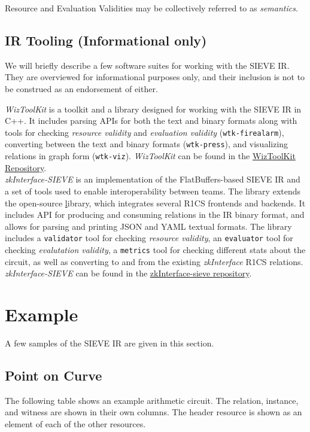 \documentclass[12pt]{article}
\begin{document}
Resource and Evaluation Validities may be collectively referred to as \textit{semantics}.

\subsection{IR Tooling (Informational only)}
We will briefly describe a few software suites for working with the SIEVE IR.
They are overviewed for informational purposes only, and their inclusion is not to be construed as an endorsement of either.

\textit{WizToolKit} is a toolkit and a library designed for working with the SIEVE IR in C++.
It includes parsing APIs for both the text and binary formats along with tools for checking \textit{resource validity} and \textit{evaluation validity} (\texttt{wtk-firealarm}), converting between the text and binary formats (\texttt{wtk-press}), and visualizing relations in graph form (\texttt{wtk-viz}).
\textit{WizToolKit} can be found in the \href{https://github.mit.edu/sieve-all/wiztoolkit}{WizToolKit Repository}.\\

\textit{zkInterface-SIEVE} is an implementation of the FlatBuffers-based SIEVE IR and a set of tools used to enable interoperability between teams. The library extends the open-source \href{https://github.com/QED-it/zkinterface} library, which integrates several R1CS frontends and backends.
It includes API for producing and consuming relations in the IR binary format, and allows for parsing and printing JSON and YAML textual formats. The library includes a \texttt{validator} tool for checking \textit{resource validity}, an \texttt{evaluator} tool for checking \textit{evalutation validity}, a \texttt{metrics} tool for checking different stats about the circuit,  as well as converting to and from the existing \textit{zkInterface} R1CS relations.
\textit{zkInterface-SIEVE} can be found in the \href{https://github.mit.edu/sieve-all/zkinterface-sieve/tree/strict-IR1}{zkInterface-sieve repository}.\\

\newpage
\section{Example}\label{example}
A few samples of the SIEVE IR are given in this section.

\subsection{Point on Curve}\label{ex_ir0}
The following table shows an example arithmetic circuit.
The relation, instance, and witness are shown in their own columns.
The header resource is shown as an element of each of the other resources. \\
\end{document}
